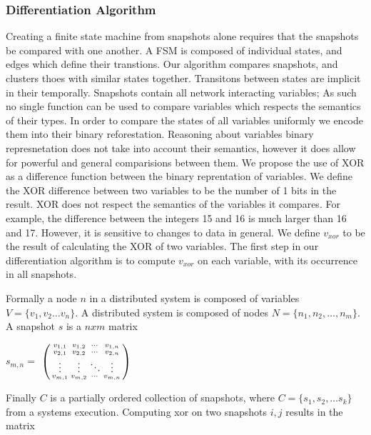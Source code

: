 \subsubsection{Differentiation Algorithm}
\label{differentiation-algorithm}

Creating a finite state machine from snapshots alone requires that the
snapshots be compared with one another. A FSM is composed of
individual states, and edges which define their transtions. Our
algorithm compares snapshots, and clusters thoes with similar states
together. Transitons between states are implicit in their temporally.
Snapshots contain all network interacting variables; As such no single
function can be used to compare variables which respects the semantics
of their types. In order to compare the states of all variables
uniformly we encode them into their binary reforestation. Reasoning
about variables binary represnetation does not take into account their
semantics, however it does allow for powerful and general comparisions
between them. We propose the use of XOR as a difference function
between the binary reprentation of variables. We define the XOR
difference between two variables to be the number of 1 bits in the
result. XOR does not respect the semantics of the variables it
compares. For example, the difference between the integers 15 and 16
is much larger than 16 and 17. However, it is sensitive to changes to
data in general.  We define $v_{xor}$ to be the result of calculating
the XOR of two variables. The first step in our differentiation
algorithm is to compute $v_{xor}$ on each variable, with its
occurrence in all snapshots.

Formally a node $n$ in a distributed system is composed of variables $V = \{
    v_1,v_2\dots v_n\}$. A distributed system is composed of nodes $N = \{n_1, n_2,
\dots , n_m \}$. A snapshot $s$ is a $n x m$ matrix

$s_{m,n} = $
$\begin{psmallmatrix}
  v_{1,1} & v_{1,2} & \cdots & v_{1,n} \\
  v_{2,1} & v_{2,2} & \cdots & v_{2,n} \\
  \vdots  & \vdots  & \ddots & \vdots  \\
  v_{m,1} & v_{m,2} & \cdots & v_{m,n} 
 \end{psmallmatrix}$

Finally $C$ is a partially ordered collection of snapshots, where  $ C = \{s_1, s_2, \dots
s_k\}$ from a systems execution. Computing xor on two snapshots $i,j$ results in
the matrix 


